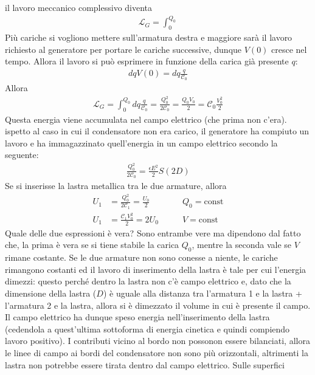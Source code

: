 \documentclass[a4paper, oneside]{article}
\begin{document}
il lavoro meccanico complessivo diventa
\begin{gather*}
    \mathcal{L}_{G} = \int_{0}^{Q_0}  
\end{gather*} 
Più cariche si vogliono mettere sull'armatura destra e maggiore 
sarà il lavoro richiesto al generatore per portare le cariche successive, 
dunque $V(0)$ cresce nel tempo. Allora il lavoro si può esprimere in funzione 
della carica già presente $q$:
\begin{gather*}
    dqV(0) = dq\frac{q}{\mathcal{C}_0 }
\end{gather*}
Allora 
\begin{gather*}
    \mathcal{L}_{G} = \int_{0}^{Q_0} dq\frac{q}{\mathcal{C}_0} = \frac{Q_0^{2}}{2\mathcal{C}_0}  = \frac{Q_0V_0}{2} = \mathcal{C}_0 \frac{V_0^{2}}{2}
\end{gather*}
Questa energia viene accumulata nel campo elettrico (che prima non c'era).
ispetto al 
caso in cui il condensatore non era carico, il generatore ha  compiuto un lavoro 
e ha immagazzinato quell'energia in un campo elettrico secondo la seguente:
\begin{gather*}
    \frac{Q_0^{2}}{2\mathcal{C}_0} = \frac{\epsilon E^{2}}{2}S(2D)
\end{gather*}
Se si inserisse la lastra metallica tra le due armature, allora
\begin{align*}
    U_1 &= \frac{Q_0^{2}}{2\mathcal{C}_1} = \frac{U_0}{2}  \qquad &Q_0 = \text{const}\\
    U_1 &= \frac{\mathcal{C}_1 V_0^{2}}{2} = 2U_0 \qquad &V = \text{const}
\end{align*}
Quale delle due espressioni è vera? Sono entrambe vere ma dipendono dal fatto che, la prima 
è vera se si tiene stabile la carica $Q_0$, mentre la seconda vale se $V$ rimane costante. 
Se le due armature non sono conesse a niente, le cariche rimangono costanti 
ed il lavoro di inserimento della lastra è tale per cui l'energia dimezzi: questo perché 
dentro la lastra non c'è campo elettrico e, dato che la dimensione della lastra ($D$) è uguale alla distanza
tra l'armatura 1 e la lastra + l'armatura 2 e la lastra, allora si è dimezzato il volume 
in cui è presente il campo. Il campo elettrico ha dunque speso energia nell'inserimento 
della lastra (cedendola a quest'ultima sottoforma di energia cinetica e quindi compiendo lavoro
positivo). I contributi vicino al bordo non possonon essere bilanciati, allora le linee di campo 
ai bordi del condensatore non sono più orizzontali, altrimenti la lastra non 
potrebbe essere tirata dentro dal campo elettrico. Sulle superfici 
\end{document}
